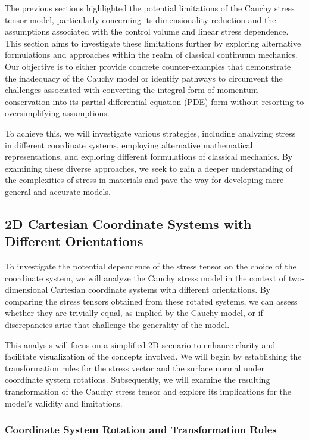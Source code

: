 \documentclass[12pt,a4paper,english]{article}
\begin{document}
The previous sections highlighted the potential limitations of the Cauchy stress tensor model, particularly concerning its dimensionality reduction and the assumptions associated with the control volume and linear stress dependence. This section aims to investigate these limitations further by exploring alternative formulations and approaches within the realm of classical continuum mechanics. Our objective is to either provide concrete counter-examples that demonstrate the inadequacy of the Cauchy model or identify pathways to circumvent the challenges associated with converting the integral form of momentum conservation into its partial differential equation (PDE) form without resorting to oversimplifying assumptions.

To achieve this, we will investigate various strategies, including analyzing stress in different coordinate systems, employing alternative mathematical representations, and exploring different formulations of classical mechanics. By examining these diverse approaches, we seek to gain a deeper understanding of the complexities of stress in materials and pave the way for developing more general and accurate models.

\subsection{2D Cartesian Coordinate Systems with Different Orientations}

To investigate the potential dependence of the stress tensor on the choice of the coordinate system, we will analyze the Cauchy stress model in the context of two-dimensional Cartesian coordinate systems with different orientations. By comparing the stress tensors obtained from these rotated systems, we can assess whether they are trivially equal, as implied by the Cauchy model, or if discrepancies arise that challenge the generality of the model.

This analysis will focus on a simplified 2D scenario to enhance clarity and facilitate visualization of the concepts involved. We will begin by establishing the transformation rules for the stress vector and the surface normal under coordinate system rotations. Subsequently, we will examine the resulting transformation of the Cauchy stress tensor and explore its implications for the model's validity and limitations.

\subsubsection{Coordinate System Rotation and Transformation Rules}
\end{document}
